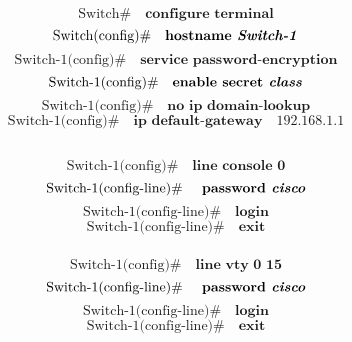 \documentclass[a4paper,11pt]{article}
\begin{document}
\subsection{}
\begin{equation}
	\text{Switch} \# \quad \textbf{configure terminal}
\end{equation}
\begin{equation}
	\text{Switch(config)} \# \quad \textbf{hostname \textit{Switch-1}}
\end{equation}
\begin{equation}
	\text{Switch-1(config)} \# \quad \textbf{service password-encryption}
\end{equation}
\begin{equation}
	\text{Switch-1(config)} \# \quad \textbf{enable secret \textit{class}}
\end{equation}
\begin{equation}
	\text{Switch-1(config)} \# \quad \textbf{no ip domain-lookup}
\end{equation}
\begin{equation}
	\text{Switch-1(config)} \# \quad \textbf{ip default-gateway} \quad  192.168.1.1
\end{equation}
\subsection{}

\subsubsection{}


\begin{equation}
	\text{Switch-1(config)} \# \quad \textbf{line console 0}
\end{equation}
\begin{equation}
	\text{Switch-1(config-line)} \# \quad \textbf{ password \textit{cisco}}
\end{equation}
\begin{equation}
	\text{Switch-1(config-line)} \# \quad \textbf{login}
\end{equation}
\begin{equation}
	\text{Switch-1(config-line)} \# \quad \textbf{exit}
\end{equation}

\subsubsection{}
\begin{equation}
	\text{Switch-1(config)} \# \quad \textbf{line vty 0 15}
\end{equation}
\begin{equation}
	\text{Switch-1(config-line)} \# \quad \textbf{ password \textit{cisco}}
\end{equation}
\begin{equation}
	\text{Switch-1(config-line)} \# \quad \textbf{login}
\end{equation}
\begin{equation}
	\text{Switch-1(config-line)} \# \quad \textbf{exit}
\end{equation}
\end{document}
